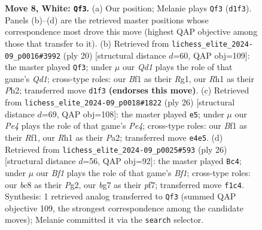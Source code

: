 \documentclass[11pt]{article}
\begin{document}
\begin{figure}[p]
\caption{\textbf{Move 8, White: \texttt{Qf3}.} (a) Our position; Melanie plays \texttt{Qf3} (\texttt{d1f3}). Panels (b)--(d) are the retrieved master positions whose correspondence most drove this move (highest QAP objective among those that transfer to it). (b) Retrieved from \texttt{lichess\_elite\_2024-09\_p0016\#3992} (ply 20) [structural distance $d$=60, QAP obj=109]: the master played \texttt{Qf3}; under $\mu$ our \emph{Qd1} plays the role of that game's \emph{Qd1}; cross-type roles: our \emph{B}f1 as their \emph{R}g1, our \emph{R}h1 as their \emph{P}h2; transferred move \texttt{d1f3} \textbf{(endorses this move)}. (c) Retrieved from \texttt{lichess\_elite\_2024-09\_p0018\#1822} (ply 26) [structural distance $d$=69, QAP obj=108]: the master played \texttt{e5}; under $\mu$ our \emph{Pe4} plays the role of that game's \emph{Pe4}; cross-type roles: our \emph{B}f1 as their \emph{R}f1, our \emph{R}h1 as their \emph{P}a2; transferred move \texttt{e4e5}. (d) Retrieved from \texttt{lichess\_elite\_2024-09\_p0025\#593} (ply 26) [structural distance $d$=56, QAP obj=92]: the master played \texttt{Bc4}; under $\mu$ our \emph{Bf1} plays the role of that game's \emph{Bf1}; cross-type roles: our \emph{b}c8 as their \emph{P}g2, our \emph{b}g7 as their \emph{p}f7; transferred move \texttt{f1c4}. Synthesis: 1 retrieved analog transferred to \texttt{Qf3} (summed QAP objective 109, the strongest correspondence among the candidate moves); Melanie committed it via the \texttt{search} selector.}
\label{fig:thought-m14}
\end{figure}

\clearpage
\end{document}
